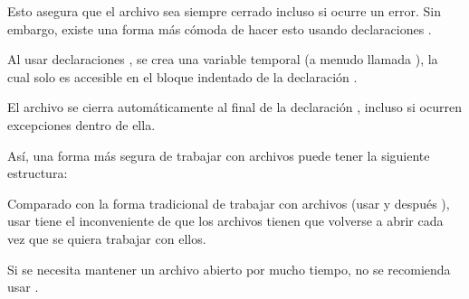 Esto asegura que el archivo sea siempre cerrado incluso si ocurre un error.
Sin embargo, existe una forma más cómoda de hacer esto usando declaraciones .

Al usar declaraciones , se crea una variable temporal (a menudo llamada ), la cual solo es accesible en el bloque indentado de la declaración .


El archivo se cierra automáticamente al final de la declaración , incluso si ocurren excepciones dentro de ella.

Así, una forma más segura de trabajar con archivos puede tener la siguiente estructura:


Comparado con la forma tradicional de trabajar con archivos (usar  y después ), usar  tiene el inconveniente de que los archivos tienen que volverse a abrir cada vez que se quiera trabajar con ellos.

Si se necesita mantener un archivo abierto por mucho tiempo, no se recomienda usar .

\clearpage